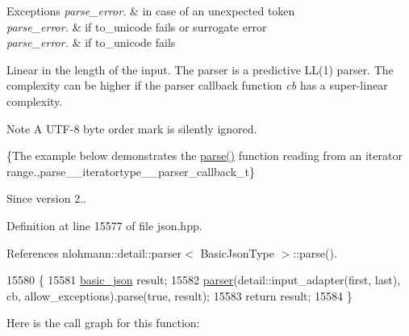 \begin{DoxyExceptions}{Exceptions}
{\em parse\+\_\+error.} & in case of an unexpected token \\
\hline
{\em parse\+\_\+error.} & if to\+\_\+unicode fails or surrogate error \\
\hline
{\em parse\+\_\+error.} & if to\+\_\+unicode fails\\
\hline
\end{DoxyExceptions}
Linear in the length of the input. The parser is a predictive L\+L(1) parser. The complexity can be higher if the parser callback function {\itshape cb} has a super-\/linear complexity.

\begin{DoxyNote}{Note}
A U\+T\+F-\/8 byte order mark is silently ignored.
\end{DoxyNote}
\{The example below demonstrates the {\ttfamily \hyperlink{classnlohmann_1_1basic__json_aa9676414f2e36383c4b181fe856aa3c0}{parse()}} function reading from an iterator range.,parse\+\_\+\+\_\+iteratortype\+\_\+\+\_\+parser\+\_\+callback\+\_\+t\}

\begin{DoxySince}{Since}
version 2.. 
\end{DoxySince}


Definition at line 15577 of file json.\+hpp.



References nlohmann\+::detail\+::parser$<$ Basic\+Json\+Type $>$\+::parse().


\begin{DoxyCode}
15580     \{
15581         \hyperlink{classnlohmann_1_1basic__json_aed115142bd0c6c66c864700e0467df55}{basic\_json} result;
15582         \hyperlink{classnlohmann_1_1basic__json_aba9704e82d18f8954f9925e26cec7a51}{parser}(detail::input\_adapter(first, last), cb, allow\_exceptions).parse(\textcolor{keyword}{true}, result);
15583         \textcolor{keywordflow}{return} result;
15584     \}
\end{DoxyCode}
Here is the call graph for this function\+:
\mbox{\label{classnlohmann_1_1basic__json_a81e0c41a4a9dff4df2f6973f7f8b2a83}} 
